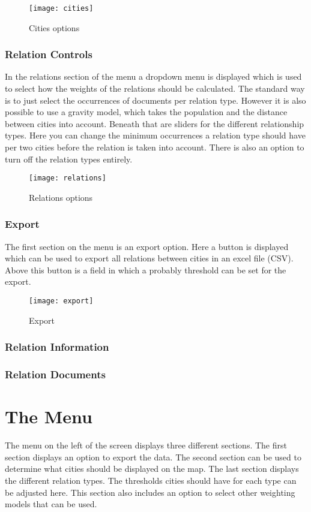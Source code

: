 \begin{figure}[H]
    \centering
    \texttt{[image: cities]}
    \caption{Cities options}
    \label{fig:infoflow}
\end{figure}

\subsubsection{Relation Controls}
In the relations section of the menu a dropdown menu is displayed which is used to select how the weights of the relations should be calculated. The standard way is to just select the occurrences of documents per relation type. However it is also possible to use a gravity model, which takes the population and the distance between cities into account.  Beneath that are sliders for the different relationship types. Here you can change the minimum occurrences a relation type should have per two cities before the relation is taken into account. There is also an option to turn off the relation types entirely.

\begin{figure}[H]
    \centering
    \texttt{[image: relations]}
    \caption{Relations options}
    \label{fig:infoflow}
\end{figure}

\subsubsection{Export}
The first section on the menu is an export option. Here a button is displayed which can be used to export all relations between cities in an excel file (CSV). Above this button is a field in which a probably threshold can be set for the export. 

\begin{figure}[H]
    \centering
    \texttt{[image: export]}
    \caption{Export}
    \label{fig:infoflow}
\end{figure}

\subsubsection{Relation Information}
\subsubsection{Relation Documents}


\section{The Menu}
The menu on the left of the screen displays three different sections. The first section displays an option to export the data. The second section can be used to determine what cities should be displayed on the map. The last section displays the different relation types. The thresholds cities should have for each type can be adjusted here. This section also includes an option to select other weighting models that can be used.


